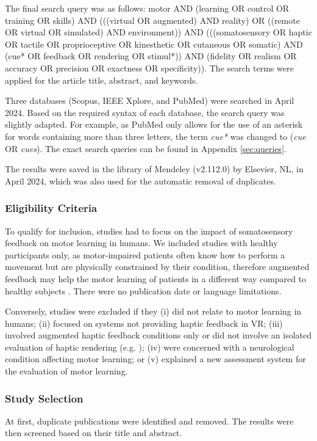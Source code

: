 The final search query was as follows: motor AND (learning OR control OR training OR skills) AND (((virtual OR augmented) AND reality) OR ((remote OR virtual OR simulated) AND environment)) AND (((somatosensory OR haptic OR tactile OR proprioceptive OR kinesthetic OR cutaneous OR somatic) AND 
(cue* OR feedback OR rendering OR stimul*)) AND (fidelity OR realism OR accuracy OR precision OR exactness OR specificity)). The search terms were applied for the article title, abstract, and keywords.

Three databases (Scopus, IEEE Xplore, and PubMed) were searched in April 2024. Based on the required syntax of each database, the search query was slightly adapted. For example, as PubMed only allows for the use of an asterisk for words containing more than three letters, the term \textit{cue*} was changed to (\textit{cue} OR \textit{cues}). The exact search queries can be found in Appendix \ref{sec:queries}. 

The results were saved in the library of Mendeley (v2.112.0) by Elsevier, NL, in April 2024, which was also used for the automatic removal of duplicates. 

\subsubsection{Eligibility Criteria}
\label{sec:eligibility}
To qualify for inclusion, studies had to focus on the impact of somatosensory feedback on motor learning in humans. We included studies with healthy participants only, as motor-impaired patients often know how to perform a movement but are physically constrained by their condition, therefore augmented feedback may help the motor learning of patients in a different way compared to healthy subjects \cite{Sigrist2013AugmentedReview}. There were no publication date or language limitations.

Conversely, studies were excluded if they (i) did not relate to motor learning in humans; (ii) focused on systems not providing haptic feedback in VR; (iii) involved augmented haptic feedback conditions only or did not involve an isolated evaluation of haptic rendering (e.g. \cite{Caccianiga2021, LeeH2014}); (iv) were concerned with a neurological condition affecting motor learning; or (v) explained a new assessment system for the evaluation of motor learning.

\subsubsection{Study Selection}
At first, duplicate publications were identified and removed. The results were then screened based on their title and abstract. 

